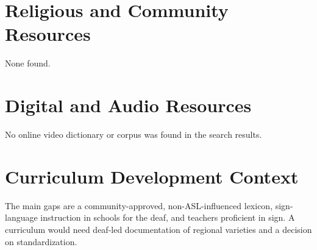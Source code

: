 \documentclass[12pt]{article}
\begin{document}
\section{Religious and Community Resources}
None found.

\section{Digital and Audio Resources}
No online video dictionary or corpus was found in the search results.

\section{Curriculum Development Context}
The main gaps are a community-approved, non-ASL-influenced lexicon, sign-language instruction in schools for the deaf, and teachers proficient in sign. A curriculum would need deaf-led documentation of regional varieties and a decision on standardization.
\end{document}
